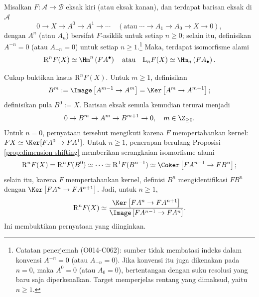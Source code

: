 \begin{korolari}\label{prop:acyclic-resolution}
	Misalkan $F: \mathcal{A} \to \mathcal{B}$ eksak kiri (atau eksak kanan), dan terdapat barisan eksak di $\mathcal{A}$
	\[ 0 \to X  \to A^0 \to A^1 \to \cdots \quad (\text{atau}\; \cdots \to A_1 \to A_0 \to X \to 0 ), \]
	dengan $A^n$ (atau $A_n$) bersifat $F$-asiklik untuk setiap $n \geq 0$; selain itu, definisikan $A^{-n} = 0$ (atau $A_{-n} = 0$) untuk setiap $n \geq 1$.\footnote{Catatan penerjemah (O014-C062): sumber tidak membatasi indeks dalam konvensi $A^{-n}=0$ (atau $A_{-n}=0$). Jika konvensi itu juga dikenakan pada $n=0$, maka $A^0=0$ (atau $A_0=0$), bertentangan dengan suku resolusi yang baru saja diperkenalkan. Target memperjelas rentang yang dimaksud, yaitu $n \geq 1$.} Maka, terdapat isomorfisme alami
	\[ \mathrm{R}^n F(X) \simeq \Hm^n\left( FA^\bullet \right) \quad \text{atau}\quad \mathrm{L}_n F(X) \simeq \Hm_n\left(FA_\bullet\right). \]
\end{korolari}
\begin{bukti}
	Cukup buktikan kasus $\mathrm{R}^n F(X)$. Untuk $m \geq 1$, definisikan
	\[ B^m := \Image\left[ A^{m-1} \to A^m \right] = \Ker\left[ A^m \to A^{m+1} \right]; \]
	definisikan pula $B^0 := X$. Barisan eksak semula kemudian terurai menjadi
	\[ 0 \to B^m \to A^m \to B^{m+1} \to 0, \quad m \in \Z_{\geq 0}. \]
	Untuk $n=0$, pernyataan tersebut mengikuti karena $F$ mempertahankan kernel: $FX \simeq \Ker[FA^0 \to FA^1]$. Untuk $n \geq 1$, penerapan berulang Proposisi \ref{prop:dimension-shifting} memberikan serangkaian isomorfisme alami
	\[ \mathrm{R}^n F(X) = \mathrm{R}^n F(B^0) \simeq \cdots \simeq \mathrm{R}^1 F(B^{n-1}) \simeq \Coker\left[ FA^{n-1} \to FB^n \right]; \]
	selain itu, karena $F$ mempertahankan kernel, definisi $B^n$ mengidentifikasi $FB^n$ dengan $\Ker\left[ FA^n \to FA^{n+1} \right]$. Jadi, untuk $n \geq 1$,
	\[ \mathrm{R}^n F(X) \simeq \frac{\Ker\left[ FA^n \to FA^{n+1} \right]}{\Image\left[ FA^{n-1} \to FA^n \right]}. \]
	Ini membuktikan pernyataan yang diinginkan.
\end{bukti}


